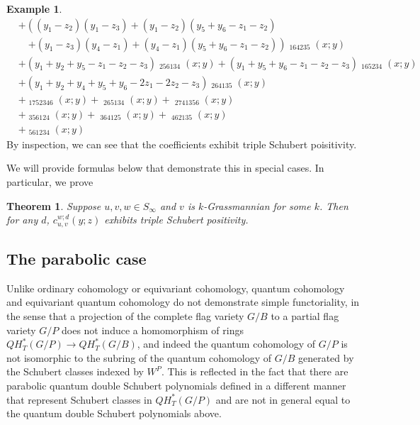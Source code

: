 \documentclass{amsart}
\newtheorem{theorem}[lemma]{Theorem}
\theoremstyle{definition}
\newtheorem{example}[lemma]{Example}
\theoremstyle{remark}
\numberwithin{equation}{section}
\DeclareMathOperator{\qsch}{\widetilde{\mathfrak{S}}}
\begin{document}
\begin{example}
\begin{align*}
&+ \left(\left(y_{1} - z_{2}\right) \left(y_{1} - z_{3}\right) + \left(y_{1} - z_{2}\right) \left(y_{5} + y_{6} - z_{1} - z_{2}\right) \right. \\
&\quad \left. + \left(y_{1} - z_{3}\right) \left(y_{4} - z_{1}\right) + \left(y_{4} - z_{1}\right) \left(y_{5} + y_{6} - z_{1} - z_{2}\right)\right) \qsch_{164235}{\left(x; y \right)} \\
&+ \left(y_{1} + y_{2} + y_{5} - z_{1} - z_{2} - z_{3}\right) \qsch_{256134}{\left(x; y \right)} + \left(y_{1} + y_{5} + y_{6} - z_{1} - z_{2} - z_{3}\right) \qsch_{165234}{\left(x; y \right)} \\
&+ \left(y_{1} + y_{2} + y_{4} + y_{5} + y_{6} - 2 z_{1} - 2 z_{2} - z_{3}\right) \qsch_{264135}{\left(x; y \right)} \\
&+ \qsch_{1752346}{\left(x; y \right)} + \qsch_{265134}{\left(x; y \right)} + \qsch_{2741356}{\left(x; y \right)} \\
&+ \qsch_{356124}{\left(x; y \right)} + \qsch_{364125}{\left(x; y \right)} + \qsch_{462135}{\left(x; y \right)} \\
&+ \qsch_{561234}{\left(x; y \right)}
\end{align*}
By inspection, we can see that the coefficients exhibit triple Schubert poisitivity.
\end{example}


We will provide formulas below that demonstrate this in special cases. In particular, we prove

\begin{theorem}
Suppose $u,v,w\in S_\infty$ and $v$ is $k$-Grassmannian for some $k$. Then for any $d$, $c_{u,v}^{w;d}(y;z)$ exhibits triple Schubert positivity.
\end{theorem}

\subsection{The parabolic case}

Unlike ordinary cohomology or equivariant cohomology, quantum cohomology and equivariant quantum cohomology do not demonstrate simple functoriality, in the sense that a projection of the complete flag variety $G/B$ to a partial flag variety $G/P$ does not induce a homomorphism of rings $QH_T^*(G/P)\to QH_T^*(G/B)$, and indeed the quantum cohomology of $G/P$ is not isomorphic to the subring of the quantum cohomology of $G/B$ generated by the Schubert classes indexed by $W^P$. This is reflected in the fact that there are parabolic quantum double Schubert polynomials defined in a different manner that represent Schubert classes in $QH_T^*(G/P)$ \cite{lam2014quantum} and are not in general equal to the quantum double Schubert polynomials above.
\end{document}
